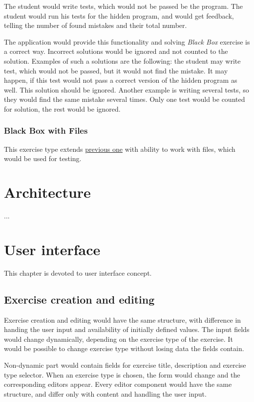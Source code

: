             The student would write tests, which would not be passed be the program. The student would run his tests for the hidden program, and would get feedback, telling the number of found mistakes and their total number.
            
            The application would provide this functionality and solving \textit{Black Box} exercise is a correct way. Incorrect solutions would be ignored and not counted to the solution. Examples of such a solutions are the following: the student may write test, which would not be passed, but it would not find the mistake. It may happen, if this test would not pass a correct version of the hidden program as well. This solution should be ignored. Another example is writing several tests, so they would find the same mistake several times. Only one test would be counted for solution, the rest would be ignored.
            
            
            \subsubsection{Black Box with Files}
            This exercise type extends \hyperref[subsubsec:blackbox]{previous one} with ability to work with files, which would be used for testing.


\section{Architecture}

...

\section{User interface}
This chapter is devoted to user interface concept.
    
    \subsection{Exercise creation and editing}
    Exercise creation and editing would have the same structure, with difference in handing the user input and availability of initially defined values. The input fields would change dynamically, depending on the exercise type of the exercise. It would be possible to change exercise type without losing data the fields contain.
    
    Non-dynamic part would contain fields for exercise title, description and exercise type selector. When an exercise type is chosen, the form would change and the corresponding editors appear. Every editor component would have the same structure, and differ only with content and handling the user input.
    
